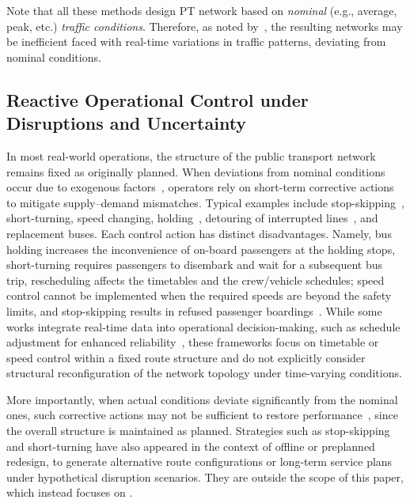 \documentclass[a4paper,fleqn]{cas-sc}
\begin{document}
Note that all these methods design PT network based on \emph{nominal} (e.g., average, peak, etc.) \emph{traffic conditions}.
Therefore, as noted by~\citep{tan2024optimizing}, the resulting networks may be inefficient faced with real-time variations in traffic patterns, deviating from nominal conditions. 

\subsection{Reactive Operational Control under Disruptions and Uncertainty}
\label{sec:reactive}

In most real-world operations, the structure of the public transport network remains fixed as originally planned. 
When deviations from nominal conditions occur due to exogenous factors~\citep{nissen2020does, chen2009analyzing}, 
operators rely on short-term corrective actions to mitigate supply--demand mismatches.
Typical examples include stop-skipping~\citep{peled2021quality}, short-turning, 
speed changing, holding~\citep{tang2018optimal, manasra2019optimization, gkiotsalitis2020public, olvera2023holding}, 
detouring of interrupted lines~\citep{zheng2023multi}, and replacement buses.
Each control action has distinct disadvantages.
Namely, bus holding increases the inconvenience of on-board passengers at the holding stops, short-turning requires passengers to disembark and wait for a subsequent bus trip, rescheduling affects the timetables and the crew/vehicle schedules; speed control cannot be implemented when the required speeds are beyond the safety limits, and stop-skipping results in refused passenger boardings~\citep{gkiotsalitis2021stop}.
While some works integrate real-time data into operational decision-making, such as schedule adjustment for enhanced reliability~\citep{cao2019real}, these frameworks focus on timetable or speed control within a fixed route structure and do not explicitly consider structural reconfiguration of the network topology under time-varying conditions.

More importantly, when actual conditions deviate significantly from the nominal ones, such corrective actions may not be sufficient to restore performance~\citep{guo2024restoring}, since the overall structure is maintained as planned.
%
Strategies such as stop-skipping and short-turning have also appeared in the context of offline or preplanned redesign, to generate alternative route configurations or long-term service plans under hypothetical disruption scenarios. They are outside the scope of this paper, which instead focuses on .
\end{document}
